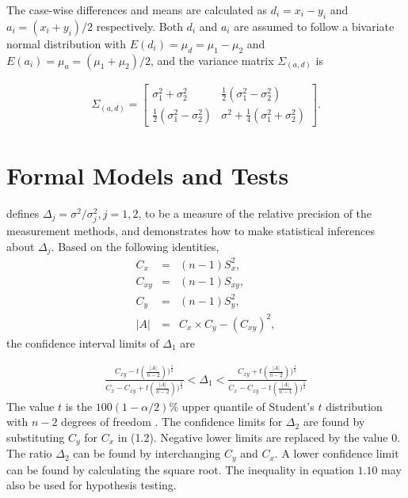 \documentclass[12pt, a4paper]{report}
\theoremstyle{plain}
\theoremstyle{definition}
\theoremstyle{remark}
\begin{document}

The case-wise differences and means are calculated as $d_{i} =
x_{i}-y_{i}$ and $a_{i} = (x_{i}+y_{i})/2$  respectively. Both
$d_{i}$ and $a_{i}$ are assumed to follow a bivariate normal
distribution with $E(d_{i})= \mu_{d} = \mu_{1} - \mu_{2}$ and
$E(a_{i})= \mu_{a} = (\mu_{1} + \mu_{2})/2$, and the variance matrix
$\Sigma_{(a,d)}$ is

\begin{eqnarray}
\Sigma_{(a,d)}= \left[\begin{matrix}
\sigma^{2}_{1}+\sigma^{2}_{2}&\frac{1}{2}(\sigma^{2}_{1}-\sigma^{2}_{2})\\
\frac{1}{2}(\sigma^{2}_{1}-\sigma^{2}_{2})&\sigma^{2}+
\frac{1}{4}(\sigma^{2}_{1}+\sigma^{2}_{2})
\end{matrix} \right].
\end{eqnarray}
\section{Formal Models and Tests}

\citet{Thompson} defines $\Delta_j = \sigma^2 / \sigma^2_j, j=1,2$, to be a measure of the
relative precision of the measurement methods, and demonstrates how to make statistical inferences about $\Delta_{j}$.
Based on the following identities,
\begin{eqnarray*}
	C_{x}&=&(n-1)S^2_{x},\nonumber\\
	C_{xy}&=&(n-1)S_{xy},\nonumber\\
	C_{y}&=&(n-1)S^2_{y},\nonumber\\
	|A| &=& C_{x}\times C_{y} - (C_{xy})^2,\nonumber
\end{eqnarray*}
\noindent the confidence interval limits of $\Delta_{1}$ are

\begin{eqnarray}
\frac{C_{xy}-
	t(\frac{|A|}{n-2}))^{\frac{1}{2}}}{C_{x}-C_{xy}+
	t(\frac{|A|}{n-2}))^{\frac{1}{2}}} <
\Delta_{1} < \frac{C_{xy}+
	t(\frac{|A|}{n-2}))^{\frac{1}{2}}}{C_{x}-C_{xy}-
	t(\frac{|A|}{n-1}))^{\frac{1}{2}}} \nonumber
\end{eqnarray}
The value $t$ is the $100(1-\alpha/2)\%$ upper quantile of
Student's $t$ distribution with $n-2$ degrees of freedom
\citep{Kinsella}. The confidence limits for $\Delta_{2}$ are found by substituting $C_{y}$ for $C_{x}$ in (1.2).
Negative lower limits are replaced by the value $0$.
The ratio $\Delta_{2}$
can be found by interchanging $C_{y}$ and $C_{x}$. A lower
confidence limit can be found by calculating the square root. The
inequality in equation $1.10$ may also be used for hypothesis
testing.
\end{document}
